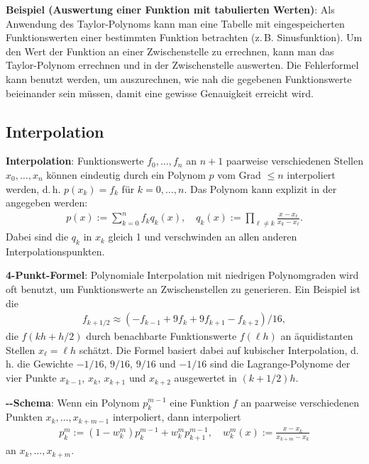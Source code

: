 \linie

\textbf{Beispiel (Auswertung einer Funktion mit tabulierten Werten)}:
Als Anwendung des Taylor-Polynoms kann man eine Tabelle mit eingespeicherten
Funktionswerten einer bestimmten Funktion betrachten (z.\,B. Sinusfunktion).
Um den Wert der Funktion an einer Zwischenstelle zu errechnen, kann man das Taylor-Polynom
errechnen und in der Zwischenstelle auswerten.
Die Fehlerformel kann benutzt werden, um auszurechnen, wie nah die gegebenen Funktionswerte
beieinander sein müssen, damit eine gewisse Genauigkeit erreicht wird.

\pagebreak

\subsection{%
    Interpolation%
}

\textbf{Interpolation}:
Funktionswerte $f_0, \dotsc, f_n$ an $n + 1$ paarweise verschiedenen Stellen $x_0, \dotsc, x_n$
können eindeutig durch ein Polynom $p$ vom Grad $\le n$ interpoliert werden,
d.\,h. $p(x_k) = f_k$ für $k = 0, \dotsc, n$.
Das Polynom kann explizit in der  angegeben werden:
\begin{align*}
    p(x) := \sum_{k=0}^n f_k q_k(x),\quad
    q_k(x) := \prod_{\ell\not=k} \frac{x - x_\ell}{x_k - x_\ell}.
\end{align*}
Dabei sind die  $q_k$ in $x_k$ gleich 1 und verschwinden an
allen anderen Interpolationspunkten.

\linie

\textbf{4-Punkt-Formel}:
Polynomiale Interpolation mit niedrigen Polynomgraden wird oft benutzt, um Funktionswerte
an Zwischenstellen zu generieren.
Ein Beispiel ist die 
\begin{align*}
    f_{k+1/2} \approx (-f_{k-1} + 9f_k + 9f_{k+1} - f_{k+2})/16,
\end{align*}
die $f(kh + h/2)$ durch benachbarte Funktionswerte $f(\ell h)$ an äquidistanten Stellen
$x_\ell = \ell h$ schätzt.
Die Formel basiert dabei auf kubischer Interpolation,
d.\,h. die Gewichte $-1/16$, $9/16$, $9/16$ und $-1/16$ sind die Lagrange-Polynome
der vier Punkte $x_{k-1}$, $x_k$, $x_{k+1}$ und $x_{k+2}$ ausgewertet in $(k + 1/2)h$.

\linie

\textbf{--Schema}:
Wenn ein Polynom $p_k^{m-1}$ eine Funktion $f$ an paarweise verschiedenen Punkten
$x_k, \dotsc, x_{k+m-1}$ interpoliert, dann interpoliert
\begin{align*}
    p_k^m := (1 - w_k^m) p_k^{m-1} + w_k^m p_{k+1}^{m-1},\quad
    w_k^m(x) := \frac{x - x_k}{x_{k+m} - x_k}
\end{align*}
an $x_k, \dotsc, x_{k+m}$.


